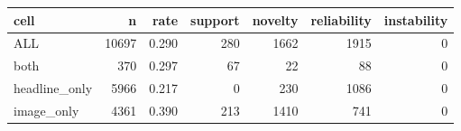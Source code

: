 \begin{tabular}{lrrrrrr}
\toprule
cell & n & rate & support & novelty & reliability & instability \\
\midrule
ALL & 10697 & 0.290 & 280 & 1662 & 1915 & 0 \\
both & 370 & 0.297 & 67 & 22 & 88 & 0 \\
headline\_only & 5966 & 0.217 & 0 & 230 & 1086 & 0 \\
image\_only & 4361 & 0.390 & 213 & 1410 & 741 & 0 \\
\bottomrule
\end{tabular}
